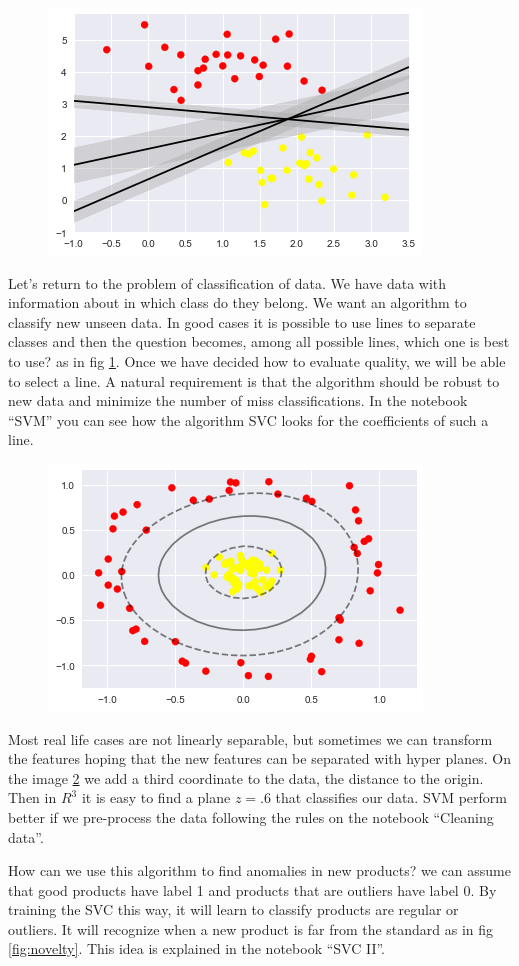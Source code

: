 \documentclass[11pt,letterpaper]{report}
\begin{document}
	\begin{figure}[h!]
		\centering
		\includegraphics[width=0.45\linewidth]{figures/svcl.png}
		\caption{}
		\label{fig:lines}
	\end{figure} 
	
	Let's return to the problem of classification of data. We have data with information about in which class do they belong. We want an algorithm to classify new unseen data. In good cases it is possible to use lines to separate classes and then the question becomes, among all possible lines, which one is best to use? as in fig \ref{fig:lines}. Once we have decided how to evaluate quality, we will be able to select a line. A natural requirement is that the algorithm should be robust to new data and minimize the number of miss classifications. In the notebook ``SVM'' you can see how the algorithm SVC looks for  the coefficients of such a line.

\begin{figure}[h!]
	\centering
	\includegraphics[width=0.45\linewidth]{figures/svc.png}
	\caption{}
	\label{fig:kernel}
\end{figure} 
	
 Most real life cases are not linearly separable, but sometimes we can transform the features hoping that the new features can be separated  with hyper planes. On the image \ref{fig:kernel} we add a third coordinate to the data, the distance to the origin. Then in $R^3$ it is easy to find a plane $z=.6$ that classifies our data. SVM perform better if we pre-process the data following the rules on the notebook ``Cleaning data''. 
 
How can we use this algorithm to find anomalies in new products? we can assume that good products have label 1 and products that are outliers have label 0. By training the SVC this way, it will learn to classify products are regular or outliers. It will recognize when a new product is far from the standard as in fig \ref{fig:novelty}. This idea is explained in the notebook ``SVC II''. 
	
\end{document}

